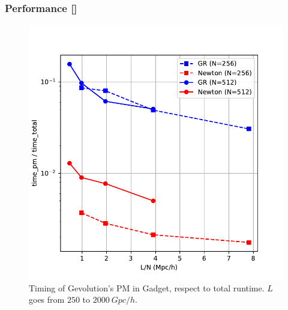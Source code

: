 \documentclass{beamer}
\makeatletter
\newcommand{\mylabel}{%
   [\beamer@againname]}
\makeatother
\begin{document}
\begin{frame}[label=performancetime]
   \frametitle{Performance\mylabel}
  \vspace*{-.5cm}
  \begin{figure}
      \includegraphics[height=.8\textheight]{images/appendix/gr-vs-newton.pdf}%
      \caption{Timing of Gevolution's PM in Gadget, respect to total runtime.
      $L$ goes from $250$ to $\SI{2000}{Gpc}/h$.}
  \end{figure}
\end{frame}
\end{document}
